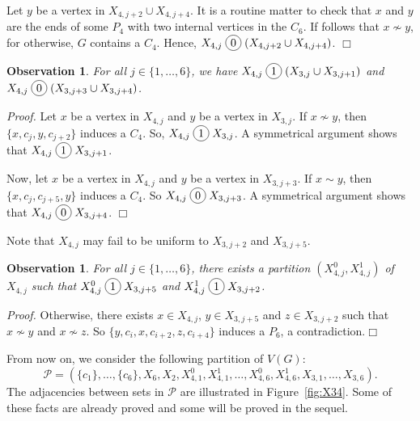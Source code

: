 \documentclass[12pt]{article}
\newcommand*\circled[1]{\tikz[baseline=(char.base)]{
		\node[shape=circle,draw,inner sep=2pt] (char) {#1};}}
\newtheorem{Observation}[Theorem]{Observation}
\newcommand{\join}{\; \circled{1} \;}
\newcommand{\cojoin}{\; \circled{0} \;}
\newcommand{\qed}{\hfill $\Box$}
\begin{document}
	Let $y$ be a vertex in $X_{4,j+2} \cup X_{4,j+4}$. It is a routine matter to check that $x$ and $y$ are the ends of some $P_4$ with two internal vertices in the $C_6$. If follows that $x\not\sim y$,  for otherwise, $G$ contains a $C_4$.  Hence, $X_{4,j} \cojoin (X_{4,j+2} \cup X_{4,j+4})$. \qed
	
	\begin{Observation}\label{obs:X4-join-X3}
		For all $j\in \{1, \dots, 6\}$, we have $X_{4,j} \join (X_{3,j} \cup X_{3,j+1})$ and $X_{4,j} \cojoin (X_{3,j+3} \cup X_{3,j+4})$.
	\end{Observation}
	{\it Proof.} Let $x$ be a vertex in $X_{4,j}$ and $y$ be a vertex in  $X_{3,j}$. If $x \not\sim y$, then $\{x,c_j,y,c_{j+2}\}$ induces a $C_4$. So, $X_{4,j} \join X_{3,j}$. A symmetrical argument shows that $X_{4,j} \join  X_{3,j+1}$. 
	
	Now, let $x$ be a vertex in $X_{4,j}$ and $y$ be a vertex in  $X_{3,j+3}$. If $x \sim y$, then $\{x,c_j, c_{j+5}, y\}$ induces a $C_4$. So $X_{4,j} \cojoin  X_{3,j+3}$. A symmetrical argument shows that $X_{4,j} \cojoin  X_{3,j+4}$. \qed 
	
	\medskip 
	
	Note that $X_{4, j}$ may fail to be uniform to $X_{3, j+2}$ and $X_{3, j+5}$. 
	
	
	\begin{Observation}\label{obs:X4partition}
		For all $j \in \{1, \dots, 6\}$, there exists a partition $(X_{4,j}^0, X_{4,j}^1)$ of $X_{4,j}$ such that $X_{4,j}^0 \join X_{3,j+5}$  and $X_{4,j}^1 \join X_{3,j+2}$.
	\end{Observation}
	{\it Proof.} Otherwise, there exists $x \in X_{4, j}$, $y\in X_{3, j+5}$ and $z\in X_{3, j+2}$ such that $x \not\sim y$ and $x\not\sim z$. So $\{y, c_i, x, c_{i+2}, z, c_{i+4}\}$ induces a $P_6$, a contradiction.\qed 
	
	\medskip
	
	From now on, we consider the following partition of $V(G)$:
	$$
	\mathcal P = \left(\{c_1\}, \dots, \{c_6\}, X_6, X_2, X_{4, 1}^0, X_{4, 1}^1, \dots, X_{4, 6}^0, X_{4, 6}^1, X_{3, 1}, \dots, X_{3, 6}\right).
	$$
	The adjacencies between sets in $\mathcal{P}$ are illustrated in Figure~\ref{fig:X34}. Some of these facts are already proved and some will be proved in the sequel. 
	
\end{document}
